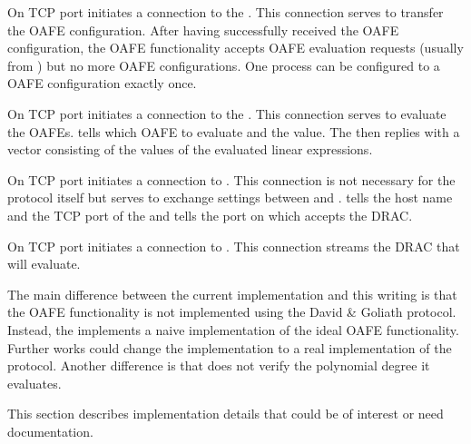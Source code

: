 
On TCP port  \JWpOne{} initiates a connection to the \JWtoken{}.
This connection serves to transfer the OAFE configuration. After having
successfully received the OAFE configuration, the OAFE functionality accepts
OAFE evaluation requests (usually from \JWpTwo{}) but no more OAFE
configurations. One \JWtoken{} process can be configured to a OAFE configuration
exactly once.



On TCP port  \JWpTwo{} initiates a connection to the \JWtoken{}.
This connection serves to evaluate the OAFEs. \JWpTwo{} tells which
OAFE to evaluate and the value. The \JWtoken{} then replies with a vector
consisting of the values of the evaluated linear expressions.



On TCP port  \JWpTwo{} initiates a connection to \JWpOne{}. This
connection is not necessary for the protocol itself but serves to exchange
settings between \JWpOne{} and \JWpTwo{}. \JWpOne{} tells \JWpTwo{} the host
name and the TCP port of the \JWtoken{} and \JWpTwo{} tells \JWpOne{} the port
on which \JWpTwo{} accepts the DRAC.



On TCP port  \JWpOne{} initiates a connection to \JWpTwo{}. This
connection streams the DRAC that \JWpTwo{} will evaluate.


%
%
\label{sec:implementation-differences}

The main difference between the current implementation and this writing is that
the OAFE functionality is not implemented using the David \& Goliath
\cite{davidgoliath} protocol. Instead, the \JWBtoken{} implements a naive
implementation of the ideal OAFE functionality. Further works could change the
implementation to a real implementation of the protocol. Another difference is
that \JWpTwo{} does not verify the polynomial degree it evaluates.


%
%
\label{sec:implementation-details}

This section describes implementation details that could be of interest or
need documentation.

